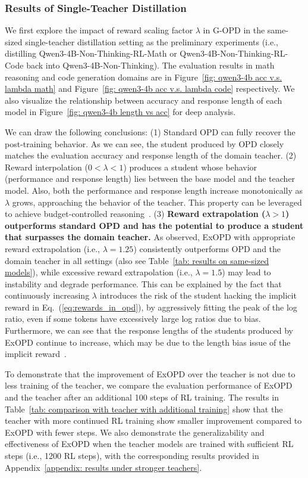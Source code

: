 \documentclass{article} %
\begin{document}
 

\subsubsection{Results of Single-Teacher Distillation}
\label{subsubsec: single-teacher distillation}
We first explore the impact of reward scaling factor $\lambda$ in G-OPD in the same-sized single-teacher distillation setting as the preliminary experiments (i.e., distilling Qwen3-4B-Non-Thinking-RL-Math or Qwen3-4B-Non-Thinking-RL-Code back into Qwen3-4B-Non-Thinking). The evaluation results in math reasoning and code generation domains are in Figure~\ref{fig: qwen3-4b acc v.s. lambda math} and Figure~\ref{fig: qwen3-4b acc v.s. lambda code} respectively.  We also visualize the relationship between accuracy and response length of each model in Figure~\ref{fig: qwen3-4b length vs acc} for deep analysis.

We can draw the following conclusions: (1) Standard OPD can fully recover the post-training behavior. As we can see, the student produced by OPD closely matches the evaluation accuracy and response length of the domain teacher. (2) Reward interpolation ($0 < \lambda < 1$) produces a student whose behavior (performance and response length) lies between the base model and the teacher model. Also, both the performance and response length increase monotonically as $\lambda$ grows, approaching the behavior of the teacher. This property can be leveraged to achieve budget-controlled reasoning~\citep{tops,orbit}. (3) \textbf{Reward extrapolation ($\lambda > 1$) outperforms standard OPD and has the potential to produce a student that surpasses the domain teacher.} As observed, ExOPD with appropriate reward extrapolation (i.e., $\lambda = 1.25$) consistently outperforms OPD and the domain teacher in all settings (also see Table~\ref{tab: results on same-sized models}), while excessive reward extrapolation (i.e., $\lambda = 1.5$) may lead to instability and degrade performance. This can be explained by the fact that continuously increasing $\lambda$ introduces the risk of the student hacking the implicit reward in Eq.~(\ref{eq:rewards_in_opd}), by aggressively fitting the peak of the log ratio, even if some tokens have excessively large log ratios due to bias. Furthermore, we can see that the response lengths of the students produced by ExOPD continue to increase, which may be due to the length bias issue of the implicit reward~\citep{laser}.

To demonstrate that the improvement of ExOPD over the teacher is not due to less training of the teacher, we compare the evaluation performance of ExOPD and the teacher after an additional 100 steps of RL training. The results in Table~\ref{tab: comparison with teacher with additional training} show that the teacher with more continued RL training show smaller improvement compared to ExOPD with fewer steps. We also demonstrate the generalizability and effectiveness of ExOPD when the teacher models are trained with sufficient RL steps (i.e., 1200 RL steps), with the corresponding results provided in Appendix~\ref{appendix: results under stronger teachers}.~
\end{document}
